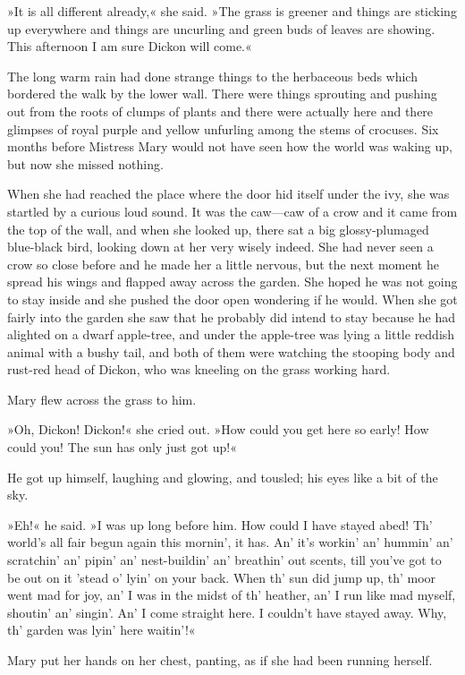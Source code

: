 »It is all different already,« she said. »The grass is greener and things are sticking up everywhere and things are uncurling and green buds of leaves are showing. This afternoon I am sure Dickon will come.«

The long warm rain had done strange things to the herbaceous beds which bordered the walk by the lower wall. There were things sprouting and pushing out from the roots of clumps of plants and there were actually here and there glimpses of royal purple and yellow unfurling among the stems of crocuses. Six months before Mistress Mary would not have seen how the world was waking up, but now she missed nothing.

When she had reached the place where the door hid itself under the ivy, she was startled by a curious loud sound. It was the caw—caw of a crow and it came from the top of the wall, and when she looked up, there sat a big glossy-plumaged blue-black bird, looking down at her very wisely indeed. She had never seen a crow so close before and he made her a little nervous, but the next moment he spread his wings and flapped away across the garden. She hoped he was not going to stay inside and she pushed the door open wondering if he would. When she got fairly into the garden she saw that he probably did intend to stay because he had alighted on a dwarf apple-tree, and under the apple-tree was lying a little reddish animal with a bushy tail, and both of them were watching the stooping body and rust-red head of Dickon, who was kneeling on the grass working hard.

Mary flew across the grass to him.

»Oh, Dickon! Dickon!« she cried out. »How could you get here so early! How could you! The sun has only just got up!«

He got up himself, laughing and glowing, and tousled; his eyes like a bit of the sky.

»Eh!« he said. »I was up long before him. How could I have stayed abed! Th' world's all fair begun again this mornin', it has. An' it's workin' an' hummin' an' scratchin' an' pipin' an' nest-buildin' an' breathin' out scents, till you've got to be out on it 'stead o' lyin' on your back. When th' sun did jump up, th' moor went mad for joy, an' I was in the midst of th' heather, an' I run like mad myself, shoutin' an' singin'. An' I come straight here. I couldn't have stayed away. Why, th' garden was lyin' here waitin'!«

Mary put her hands on her chest, panting, as if she had been running herself.

